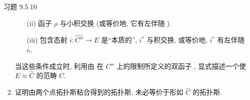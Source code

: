 \begin{enonce*}[remark]{习题 9.5.10}
\begin{enumerate}
\begin{itemize}
\item[(ii)] 函子 $\rho$ 与小积交换
(或等价地, 它有左伴随 ).

\item[(iii)] 包含态射 $i:\widehat{C''}\rightarrow E$ 是“本质的”,
\ie $i^{\ast}$ 与积交换, 或等价地, $i^{\ast}$ 有左伴随 $i_{!}$.
\end{itemize}
当这些条件成立时,
利用由 
在 $C''$ 上的限制所定义的双函子 ,
显式描述一个使 $E\approx\widehat{C}$ 的范畴 $C$.

\item 证明由两个点拓扑斯粘合得到的拓扑斯,
未必等价于形如 $\widehat{C}$ 的拓扑斯.
\end{enumerate}
\end{enonce*}

